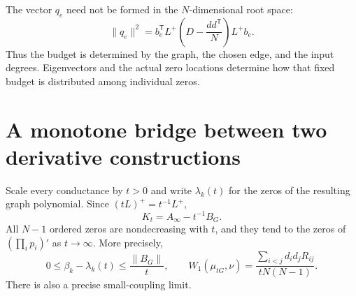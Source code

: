 \begin{remark}
The vector $q_e$ need not be formed in the $N$-dimensional root space:
\[
 \|q_e\|^2=b_e^{\mathsf T}L^+
      \left(D-\frac{dd^{\mathsf T}}N\right)L^+b_e.
\]
Thus the budget is determined by the graph, the chosen edge, and the
input degrees.  Eigenvectors and the actual zero locations determine
how that fixed budget is distributed among individual zeros.
\end{remark}

\section{A monotone bridge between two derivative constructions}

Scale every conductance by $t>0$ and write $\lambda_k(t)$ for the
zeros of the resulting graph polynomial.  Since $(tL)^+=t^{-1}L^+$,
\begin{equation}\label{eq:uniform-scale}
 K_t=A_\infty-t^{-1}B_G.
\end{equation}
All $N-1$ ordered zeros are nondecreasing with $t$, and they tend to the zeros
of $(\prod_i p_i)'$ as $t\to\infty$.  More precisely,
\[
 0\leq\beta_k-\lambda_k(t)\leq\frac{\|B_G\|}{t},\qquad
 W_1(\mu_{tG},\nu)=
 \frac{\sum_{i<j}d_i d_jR_{ij}}{tN(N-1)}.
\]
There is also a precise small-coupling limit.

